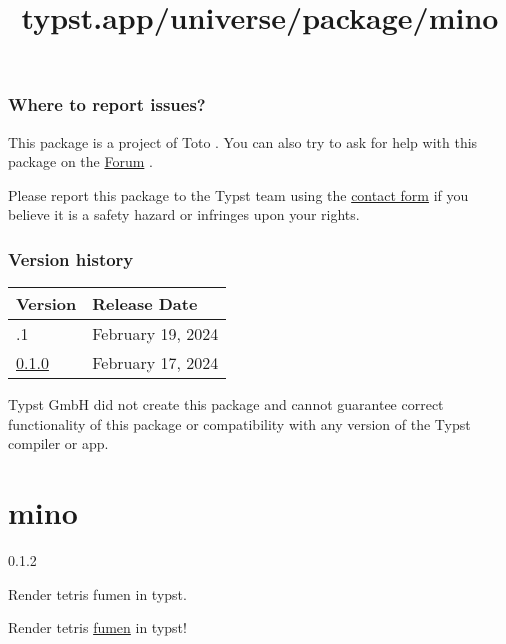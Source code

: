 \subsubsection{Where to report issues?}\label{where-to-report-issues}

This package is a project of Toto . You can also try to ask for help
with this package on the \href{https://forum.typst.app}{Forum} .

Please report this package to the Typst team using the
\href{https://typst.app/contact}{contact form} if you believe it is a
safety hazard or infringes upon your rights.

\label{versions}
\subsubsection{Version history}\label{version-history}

\begin{longtable}[]{@{}ll@{}}
\toprule\noalign{}
Version & Release Date \\
\midrule\noalign{}
\endhead
\bottomrule\noalign{}
\endlastfoot
0.1.1 & February 19, 2024 \\
\href{https://typst.app/universe/package/anatomy/0.1.0/}{0.1.0} &
February 17, 2024 \\
\end{longtable}

Typst GmbH did not create this package and cannot guarantee correct
functionality of this package or compatibility with any version of the
Typst compiler or app.


\title{typst.app/universe/package/mino}

\label{banner}
\section{mino}\label{mino}

{ 0.1.2 }

Render tetris fumen in typst.

\label{readme}
Render tetris \href{https://harddrop.com/fumen/}{fumen} in typst!

\pandocbounded{}

